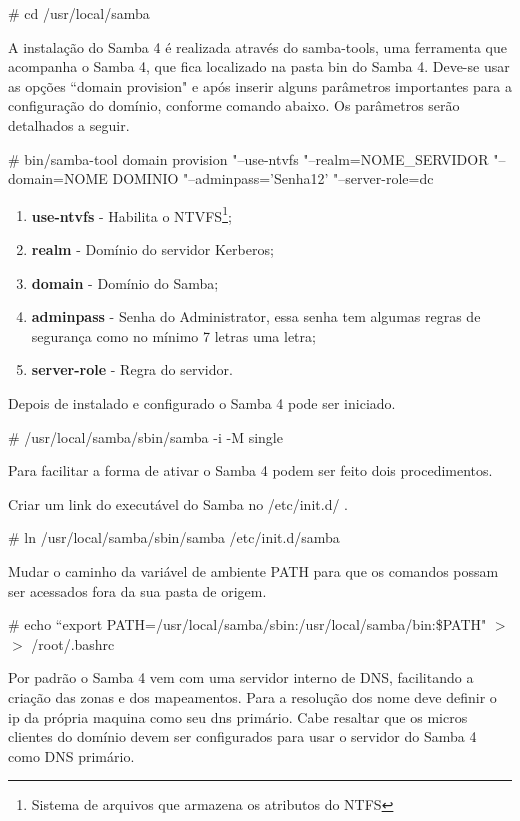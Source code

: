 \# cd /usr/local/samba

A instalação do Samba 4 é realizada através do samba-tools, uma ferramenta que acompanha o Samba 4, que fica localizado na pasta bin do Samba 4. Deve-se usar as opções ``domain provision" e após inserir alguns parâmetros importantes para a configuração do domínio, conforme comando abaixo. Os parâmetros serão detalhados a seguir.

\noindent \# bin/samba-tool domain provision "--use-ntvfs "--realm=NOME\_SERVIDOR "--domain=NOME DOMINIO  "--adminpass='Senha12' "--server-role=dc

\begin{enumerate}
	\item \textbf{use-ntvfs} - Habilita o NTVFS\footnote[3]{Sistema de arquivos que armazena os atributos do NTFS};
	\item \textbf{realm} - Domínio do servidor Kerberos;
	\item \textbf{domain} - Domínio do Samba;
	\item \textbf{adminpass} - Senha do Administrator, essa senha tem algumas regras de segurança como no mínimo 7 letras uma letra;
	\item \textbf{server-role} - Regra do servidor.
\end{enumerate}


Depois de instalado e configurado o Samba 4 pode ser iniciado.

\# /usr/local/samba/sbin/samba -i -M single

Para facilitar a forma de ativar o Samba 4 podem ser feito dois procedimentos.

Criar um link do executável do Samba no /etc/init.d/ .

\# ln /usr/local/samba/sbin/samba /etc/init.d/samba

Mudar o caminho da variável de ambiente PATH para que os comandos possam ser acessados fora da sua pasta de origem.

\# echo ``export PATH=/usr/local/samba/sbin:/usr/local/samba/bin:\$PATH"  $>$$>$ /root/.bashrc

Por padrão o Samba 4 vem com uma servidor interno de DNS, facilitando a criação das zonas e dos mapeamentos. Para a resolução dos nome deve definir o ip da própria maquina como seu dns primário. Cabe resaltar que os micros clientes do domínio devem ser configurados para usar o servidor do Samba 4 como DNS primário.

